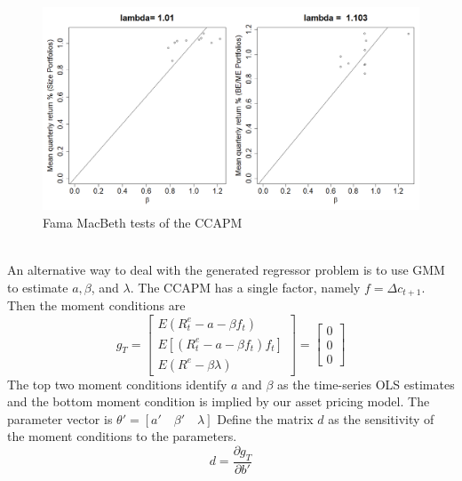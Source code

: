 \documentclass[french, 11pt]{article}
\begin{document}
\begin{figure}[!htb]
	\centering
	\includegraphics[width=0.9\linewidth]{FM_ccapm.png}
	\caption{Fama MacBeth tests of the CCAPM}
	\label{fig:FMB_CCAPM}
\end{figure}\\

 
An alternative way to deal with the generated regressor problem is to use GMM to estimate $a, \beta$, and $\lambda$. The CCAPM has a single factor, namely $f = \Delta c_{t+1}$. Then the moment conditions are
$$
	g_{T} = 
	\begin{bmatrix}
	E(R_{t}^{e} - a - \beta f_{t})\\
	E\left[(R^{e}_{t}-a-\beta f_{t})f_{t}\right]\\
	E(R^{e} - \beta \lambda)
	\end{bmatrix}
	=
	\begin{bmatrix}
	0\\ 0 \\ 0
	\end{bmatrix}
$$
The top two moment conditions identify $a$ and $\beta$ as the time-series OLS estimates and the bottom moment condition is implied by our asset pricing model. The parameter vector is $\theta' = \left[a'\quad \beta'\quad \lambda \right]$ Define the matrix $d$ as the sensitivity of the moment conditions to the parameters. 
$$
d = \dfrac{\partial g_{T}}{\partial b'}
$$
\end{document}
